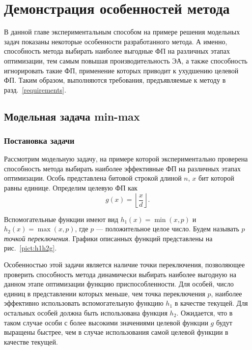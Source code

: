 \chapter{Демонстрация особенностей метода} 
\label{chapter4}

В данной главе экспериментальным способом на примере решения модельных задач показаны некоторые особенности разработанного метода. А именно, способность метода выбирать наиболее выгодные ФП на различных этапах оптимизации, тем самым повышая производительность ЭА, а также способность игнорировать такие ФП, применение которых приводит к ухудшению целевой ФП. Таким образом, выполняются требования, предъявляемые к методу в разд.~\ref{requirements}.

\section{Модельная задача min-max}
\label{model-problem}

	\subsection{Постановка задачи}
	Рассмотрим модельную задачу, на примере которой экспериментально проверена способность метода выбирать наиболее эффективные ФП на различных этапах оптимизации.
	Особь представлена битовой строкой длиной $n$, $x$ бит которой равны единице.
	Определим целевую ФП как
	\begin{equation}
	\label{eqn_target}
	g(x)=\left\lfloor \frac{x}{d} \right\rfloor.
	\end{equation}

	Вспомогательные функции имеют вид $h_1(x) = \min(x, p)$ и $h_2(x) = \max(x, p)$,
	где $p$ --- положительное целое число. Будем называть $p$ \emph{точкой переключения}.	
	Графики описанных функций представлены на рис.~\ref{pict:h1h2g}.

	Особенностью этой задачи является наличие точки переключения, позволяющее проверить способность метода динамически выбирать наиболее выгодную на данном этапе оптимизации функцию приспособленности. 
	Для особей,  число единиц в представлении которых меньше, чем точка переключения $p$, наиболее эффективно использовать вспомогательную функцию $h_1$ в качестве текущей. 
    Для остальных особей должна быть использована функция $h_2$. Ожидается, что в таком случае особи с более высокими значениями целевой функции $g$ будут выращены быстрее, 
    чем в случае использования самой целевой функции в качестве текущей. 
	
